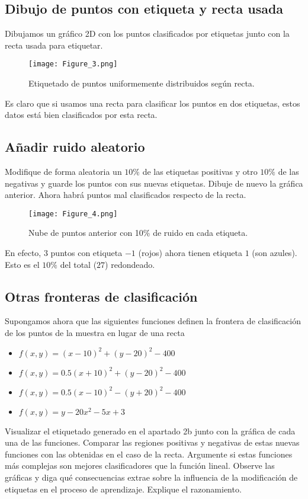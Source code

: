 \subsection{Dibujo de puntos con etiqueta y recta usada}

Dibujamos un gráfico 2D con los puntos clasificados por etiquetas junto
con la recta usada para etiquetar. 

\begin{figure}[H]
\centering
\texttt{[image: Figure\_3.png]}
\caption{Etiquetado de puntos uniformemente distribuidos según recta.}
\end{figure}

Es claro que si usamos una recta para clasificar los puntos en dos etiquetas,
estos datos está bien clasificados por esta recta.

\subsection{Añadir ruido aleatorio}

Modifique de forma aleatoria un $10\%$ de las etiquetas positivas y otro $10\%$
de las negativas y guarde los puntos con sus nuevas etiquetas. Dibuje de nuevo
la gráfica anterior. Ahora habrá puntos mal clasificados respecto de la recta.  

\begin{figure}[H]
\centering
\texttt{[image: Figure\_4.png]}
\caption{Nube de puntos anterior con 10\% de ruido en cada etiqueta.}
\end{figure}

En efecto, $3$ puntos con etiqueta $-1$ (rojos) ahora tienen etiqueta $1$
(son azules). Esto es el $10\%$ del total ($27$) redondeado.

\subsection{Otras fronteras de clasificación}

Supongamos ahora que las siguientes funciones definen la frontera de
clasificación de los puntos de la muestra en lugar de una recta 

\begin{itemize}
\item $f(x,y) = (x - 10)^2 + (y - 20)^2 - 400$
\item $f(x,y) = 0.5(x + 10)^2 + (y - 20)^2 - 400$
\item $f(x,y) = 0.5(x - 10)^2 - (y + 20)^2 - 400$
\item $f(x,y) = y - 20x^2 - 5x + 3$
\end{itemize}

Visualizar el etiquetado generado en el apartado 2b junto con la gráfica de cada
una de las funciones.  Comparar las regiones positivas y negativas de estas
nuevas funciones con las obtenidas en el caso de la recta.  Argumente si estas
funciones más complejas son mejores clasificadores que la función lineal.
Observe las gráficas y diga qué consecuencias extrae sobre la influencia de la
modificación de etiquetas en el proceso de aprendizaje. Explique el
razonamiento. 